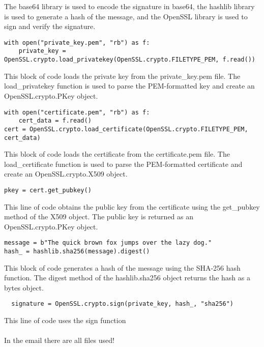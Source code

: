 \documentclass{article}
\begin{document}
The base64 library is used to encode the signature in base64, the hashlib library is used to generate a hash of the message, and the OpenSSL library is used to sign and verify the signature.\\
\begin{lstlisting}
with open("private_key.pem", "rb") as f:
    private_key = OpenSSL.crypto.load_privatekey(OpenSSL.crypto.FILETYPE_PEM, f.read())
\end{lstlisting}
This block of code loads the private key from the private\_key.pem file. The load\_privatekey function is used to parse the PEM-formatted key and create an OpenSSL.crypto.PKey object.
\begin{lstlisting}
with open("certificate.pem", "rb") as f:
    cert_data = f.read()
cert = OpenSSL.crypto.load_certificate(OpenSSL.crypto.FILETYPE_PEM, cert_data)
\end{lstlisting}
This block of code loads the certificate from the certificate.pem file. The load\_certificate function is used to parse the PEM-formatted certificate and create an OpenSSL.crypto.X509 object.
\begin{lstlisting}
pkey = cert.get_pubkey()
\end{lstlisting}
This line of code obtains the public key from the certificate using the get\_pubkey method of the X509 object. The public key is returned as an OpenSSL.crypto.PKey object.
\begin{lstlisting}
message = b"The quick brown fox jumps over the lazy dog."
hash_ = hashlib.sha256(message).digest()
\end{lstlisting}
This block of code generates a hash of the message using the SHA-256 hash function. The digest method of the hashlib.sha256 object returns the hash as a bytes object.
\begin{lstlisting}
  signature = OpenSSL.crypto.sign(private_key, hash_, "sha256")  
\end{lstlisting}
This line of code uses the sign function
\\\\
In the email there are all files used!
\end{document}
